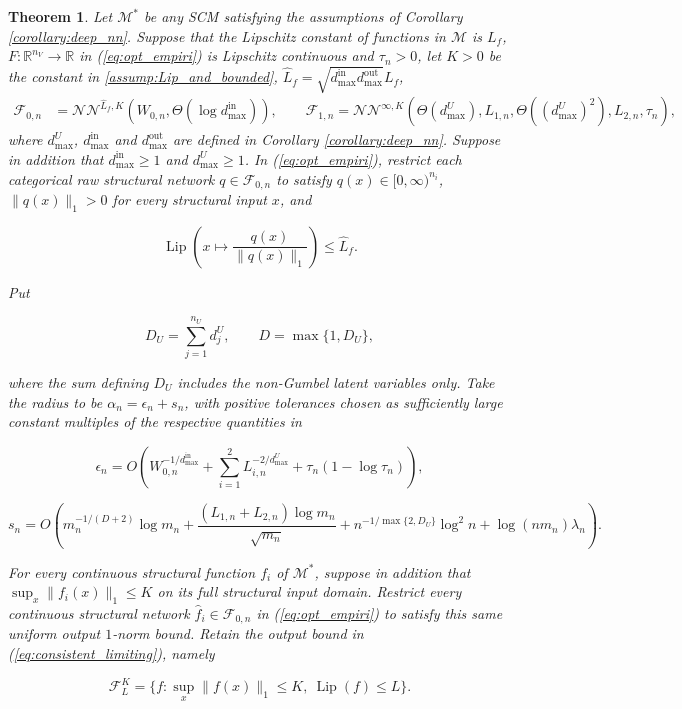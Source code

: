 \documentclass[12pt]{article}
\theoremstyle{plain}
\newtheorem{theorem}{Theorem}[section]
\theoremstyle{definition}
\theoremstyle{remark}
\begin{document}
\begin{theorem}\label{thm:consistency}
    Let $ \mathcal{M^*}$ be any SCM satisfying the assumptions of Corollary \ref{corollary:deep_nn}. Suppose that the Lipschitz constant of functions in $\mathcal{M}$ is $L_f$, $F:\mathbb{R}^{n_V}\rightarrow\mathbb{R}$ in (\ref{eq:opt_empiri}) is Lipschitz continuous and $\tau_n>0$, let $K>0$ be the constant in \cref{assump:Lip_and_bounded}, $\hat L_f=\sqrt{d_{\max}^{\text{in}}d_{\max}^{\text{out}}}L_f$,
\begin{align*}
\mathcal F_{0,n}&=\mathcal{NN}^{\hat L_f,K}\left(W_{0,n},\Theta\left(\log d_{\max}^{\text{in}}\right)\right),\qquad
\mathcal F_{1,n}=\mathcal{NN}^{\infty,K}\left(\Theta(d_{\max}^U),L_{1,n},\Theta((d_{\max}^U)^2),L_{2,n},\tau_n\right),
\end{align*}
where $d_{\max}^U$, $d_{\max}^{\text{in}}$ and $d_{\max}^{\text{out}}$ are defined in Corollary \ref{corollary:deep_nn}. Suppose in addition that $d_{\max}^{\text{in}}\geqslant1$ and $d_{\max}^U\geqslant1$. In (\ref{eq:opt_empiri}), restrict each categorical raw structural network $q\in\mathcal F_{0,n}$ to satisfy $q(x)\in[0,\infty)^{n_i}$, $\|q(x)\|_1>0$ for every structural input $x$, and

\[
\operatorname{Lip}\left(x\mapsto\frac{q(x)}{\|q(x)\|_1}\right)\leqslant\hat L_f.
\]

Put

\[
D_U=\sum_{j=1}^{n_U}d_j^U,\qquad D=\max\{1,D_U\},
\]

where the sum defining $D_U$ includes the non-Gumbel latent variables only. Take the radius to be $\alpha_n=\epsilon_n+s_n$, with positive tolerances chosen as sufficiently large constant multiples of the respective quantities in

\[
\epsilon_n=O\left(W_{0,n}^{-1/d_{\max}^{\text{in}}}+\sum_{i=1}^2L_{i,n}^{-2/d_{\max}^U}+\tau_n(1-\log\tau_n)\right),
\]

\[
s_n=O\left(m_n^{-1/(D+2)}\log m_n+\frac{(L_{1,n}+L_{2,n})\log m_n}{\sqrt{m_n}}+n^{-1/\max\{2,D_U\}}\log^2 n+\log(nm_n)\lambda_n\right).
\]

For every continuous structural function $f_i$ of $\mathcal M^*$, suppose in addition that $\sup_x\|f_i(x)\|_1\leqslant K$ on its full structural input domain. Restrict every continuous structural network $\hat f_i\in\mathcal F_{0,n}$ in (\ref{eq:opt_empiri}) to satisfy this same uniform output $1$-norm bound. Retain the output bound in (\ref{eq:consistent_limiting}), namely

\[
\mathcal F_L^K=\{f:\sup_x\|f(x)\|_1\leqslant K,\ \operatorname{Lip}(f)\leqslant L\}.
\]


\end{theorem}
\end{document}
